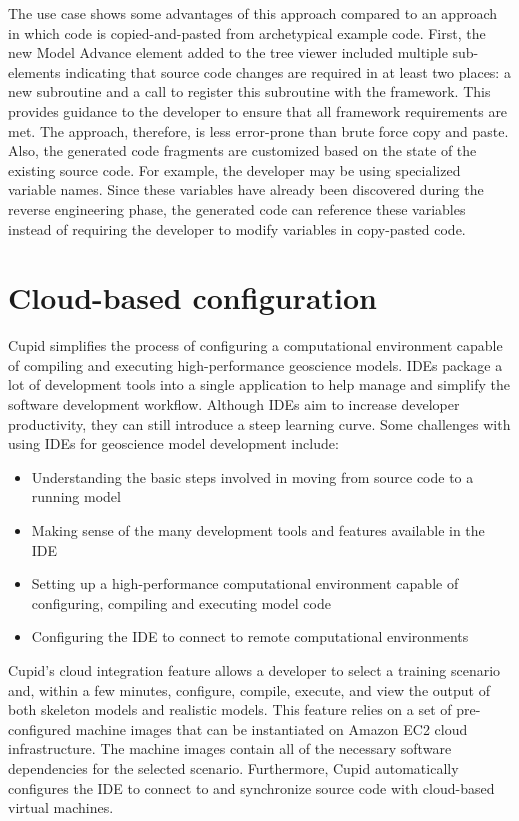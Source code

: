 \documentclass[oneside,11pt]{memoir}
\begin{document}
The use case shows some advantages of this approach compared to an approach in which code is copied-and-pasted from archetypical example code. First, the new Model Advance element added to the tree viewer included multiple sub-elements indicating that source code changes are required in at least two places: a new subroutine and a call to register this subroutine with the framework.  This provides guidance to the developer to ensure that all framework requirements are met. The approach, therefore, is less error-prone than brute force copy and paste. Also, the generated code fragments are customized based on the state of the existing source code. For example, the developer may be using specialized variable names. Since these variables have already been discovered during the reverse engineering phase, the generated code can reference these variables instead of requiring the developer to modify variables in copy-pasted code.


\chapter{Cloud-based configuration}

Cupid simplifies the process of configuring a computational environment capable of compiling and executing high-performance geoscience models. IDEs package a lot of development tools into a single application to help manage and simplify the software development workflow. Although IDEs aim to increase developer productivity, they can still introduce a steep learning curve. Some challenges with using IDEs for geoscience model development include:

\begin{itemize}
\item Understanding the basic steps involved in moving from source code to a running model
\item Making sense of the many development tools and features available in the IDE
\item Setting up a high-performance computational environment capable of configuring, compiling and executing model code
\item Configuring the IDE to connect to remote computational environments
\end{itemize}

Cupid's cloud integration feature allows a developer to select a training scenario and, within a few minutes, configure, compile, execute, and view the output of both skeleton models and realistic models. This feature relies on a set of pre-configured machine images that can be instantiated on Amazon EC2 cloud infrastructure. The machine images contain all of the necessary software dependencies for the selected scenario. Furthermore, Cupid automatically configures the IDE to connect to and synchronize source code with cloud-based virtual machines.
\end{document}
